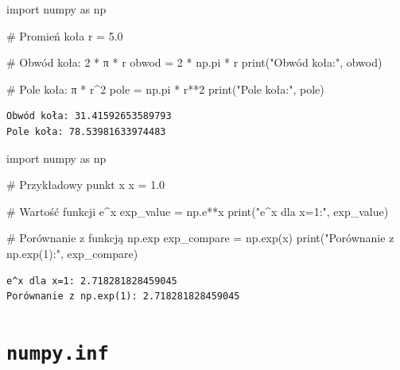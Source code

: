 \documentclass[
  letterpaper,
  DIV=11,
  numbers=noendperiod]{scrreprt}
\newenvironment{Shaded}{\begin{snugshade}}{\end{snugshade}}
\newcommand{\BuiltInTok}[1]{\textcolor[rgb]{0.00,0.23,0.31}{#1}}
\newcommand{\CommentTok}[1]{\textcolor[rgb]{0.37,0.37,0.37}{#1}}
\newcommand{\DecValTok}[1]{\textcolor[rgb]{0.68,0.00,0.00}{#1}}
\newcommand{\FloatTok}[1]{\textcolor[rgb]{0.68,0.00,0.00}{#1}}
\newcommand{\ImportTok}[1]{\textcolor[rgb]{0.00,0.46,0.62}{#1}}
\newcommand{\NormalTok}[1]{\textcolor[rgb]{0.00,0.23,0.31}{#1}}
\newcommand{\OperatorTok}[1]{\textcolor[rgb]{0.37,0.37,0.37}{#1}}
\newcommand{\StringTok}[1]{\textcolor[rgb]{0.13,0.47,0.30}{#1}}
\begin{document}
\begin{Shaded}
\begin{Highlighting}[]
\ImportTok{import}\NormalTok{ numpy }\ImportTok{as}\NormalTok{ np}

\CommentTok{\# Promień koła}
\NormalTok{r }\OperatorTok{=} \FloatTok{5.0}

\CommentTok{\# Obwód koła: 2 * π * r}
\NormalTok{obwod }\OperatorTok{=} \DecValTok{2} \OperatorTok{*}\NormalTok{ np.pi }\OperatorTok{*}\NormalTok{ r}
\BuiltInTok{print}\NormalTok{(}\StringTok{"Obwód koła:"}\NormalTok{, obwod)}

\CommentTok{\# Pole koła: π * r\^{}2}
\NormalTok{pole }\OperatorTok{=}\NormalTok{ np.pi }\OperatorTok{*}\NormalTok{ r}\OperatorTok{**}\DecValTok{2}
\BuiltInTok{print}\NormalTok{(}\StringTok{"Pole koła:"}\NormalTok{, pole)}
\end{Highlighting}
\end{Shaded}

\begin{verbatim}
Obwód koła: 31.41592653589793
Pole koła: 78.53981633974483
\end{verbatim}

\begin{Shaded}
\begin{Highlighting}[]
\ImportTok{import}\NormalTok{ numpy }\ImportTok{as}\NormalTok{ np}

\CommentTok{\# Przykładowy punkt x}
\NormalTok{x }\OperatorTok{=} \FloatTok{1.0}

\CommentTok{\# Wartość funkcji e\^{}x}
\NormalTok{exp\_value }\OperatorTok{=}\NormalTok{ np.e}\OperatorTok{**}\NormalTok{x}
\BuiltInTok{print}\NormalTok{(}\StringTok{"e\^{}x dla x=1:"}\NormalTok{, exp\_value)}

\CommentTok{\# Porównanie z funkcją np.exp}
\NormalTok{exp\_compare }\OperatorTok{=}\NormalTok{ np.exp(x)}
\BuiltInTok{print}\NormalTok{(}\StringTok{"Porównanie z np.exp(1):"}\NormalTok{, exp\_compare)}
\end{Highlighting}
\end{Shaded}

\begin{verbatim}
e^x dla x=1: 2.718281828459045
Porównanie z np.exp(1): 2.718281828459045
\end{verbatim}

\section{\texorpdfstring{\texttt{numpy.inf}}{numpy.inf}}\label{numpy.inf}
\end{document}
